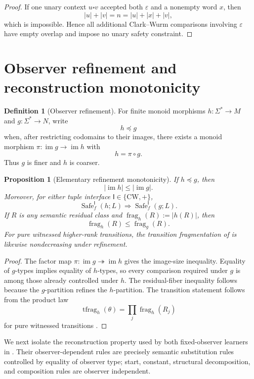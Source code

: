 \documentclass[11pt]{article}
\newtheorem{proposition}[theorem]{Proposition}
\theoremstyle{definition}
\newtheorem{definition}[theorem]{Definition}
\theoremstyle{remark}
\newcommand{\eps}{\varepsilon}
\newcommand{\im}{\operatorname{im}}
\newcommand{\tfrag}{\operatorname{tfrag}}
\newcommand{\Safe}{\operatorname{Safe}}
\newcommand{\blank}{\square}
\begin{document}
\begin{proof}
If one unary context $u\blank v$ accepted both $\eps$ and a nonempty word $x$,
then
\[
 |u|+|v|=n=|u|+|x|+|v|,
\]
which is impossible.  Hence all additional Clark--Wurm comparisons involving
$\eps$ have empty overlap and impose no unary safety constraint.
\end{proof}

\section{Observer refinement and reconstruction monotonicity}
\label{sec:refinement}

\begin{definition}[Observer refinement]
For finite monoid morphisms $h:\Sigma^*\to M$ and $g:\Sigma^*\to N$, write
\[
 h\preceq g
\]
when, after restricting codomains to their images, there exists a monoid
morphism $\pi:\im g\to\im h$ with
\[
 h=\pi\circ g.
\]
Thus $g$ is finer and $h$ is coarser.
\end{definition}

\begin{proposition}[Elementary refinement monotonicity]
\label{prop:elementary-refinement}
If $h\preceq g$, then
\[
 |\im h|\le|\im g|.
\]
Moreover, for either tuple interface $\mathsf I\in\{\mathrm{CW},+\}$,
\[
 \Safe_f^{\mathsf I}(h;L)\Longrightarrow
 \Safe_f^{\mathsf I}(g;L).
\]
If $R$ is any semantic residual class and
$\operatorname{frag}_h(R):=|h(R)|$, then
\[
 \operatorname{frag}_h(R)\le \operatorname{frag}_g(R).
\]
For pure witnessed higher-rank transitions, the transition fragmentation of
\cite{KuriyamaOFET} is likewise nondecreasing under refinement.
\end{proposition}

\begin{proof}
The factor map $\pi:\im g\twoheadrightarrow\im h$ gives the image-size
inequality.  Equality of $g$-types implies equality of $h$-types, so every
comparison required under $g$ is among those already controlled under $h$.
The residual-fiber inequality follows because the $g$-partition refines the
$h$-partition.  The transition statement follows from the product law
\[
 \tfrag_h(\theta)=\prod_j \operatorname{frag}_h(R_j)
\]
for pure witnessed transitions \cite{KuriyamaOFET}.
\end{proof}

We next isolate the reconstruction property used by both fixed-observer
learners in \cite{KuriyamaOFET}.  Their observer-dependent rules are precisely
semantic substitution rules controlled by equality of observer type; start,
constant, structural decomposition, and composition rules are observer
independent.
\end{document}
